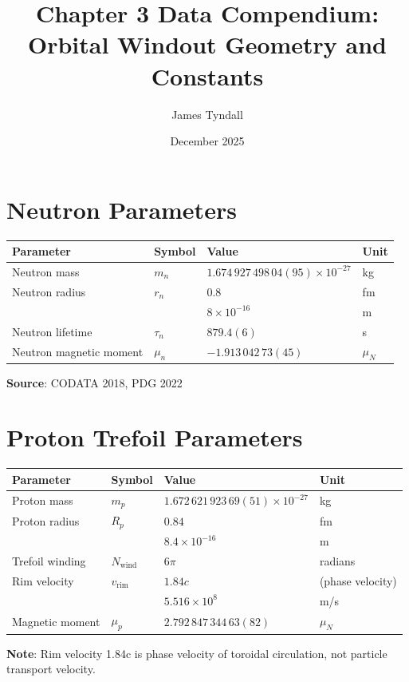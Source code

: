 \documentclass{article}
\title{Chapter 3 Data Compendium:\\Orbital Windout Geometry and Constants}
\author{James Tyndall}
\date{December 2025}
\begin{document}
\maketitle

\section{Neutron Parameters}

\begin{longtable}{llll}
\toprule
\textbf{Parameter} & \textbf{Symbol} & \textbf{Value} & \textbf{Unit} \\
\midrule
Neutron mass & $m_n$ & $1.674\,927\,498\,04(95) \times 10^{-27}$ & kg \\
Neutron radius & $r_n$ & $0.8$ & fm \\
& & $8 \times 10^{-16}$ & m \\
Neutron lifetime & $\tau_n$ & $879.4(6)$ & s \\
Neutron magnetic moment & $\mu_n$ & $-1.913\,042\,73(45)$ & $\mu_N$ \\
\bottomrule
\end{longtable}

\textbf{Source}: CODATA 2018, PDG 2022

\section{Proton Trefoil Parameters}

\begin{longtable}{llll}
\toprule
\textbf{Parameter} & \textbf{Symbol} & \textbf{Value} & \textbf{Unit} \\
\midrule
Proton mass & $m_p$ & $1.672\,621\,923\,69(51) \times 10^{-27}$ & kg \\
Proton radius & $R_p$ & $0.84$ & fm \\
& & $8.4 \times 10^{-16}$ & m \\
Trefoil winding & $N_{\text{wind}}$ & $6\pi$ & radians \\
Rim velocity & $v_{\text{rim}}$ & $1.84c$ & (phase velocity) \\
& & $5.516 \times 10^8$ & m/s \\
Magnetic moment & $\mu_p$ & $2.792\,847\,344\,63(82)$ & $\mu_N$ \\
\bottomrule
\end{longtable}

\textbf{Note}: Rim velocity 1.84c is phase velocity of toroidal circulation, not particle transport velocity.
\end{document}
